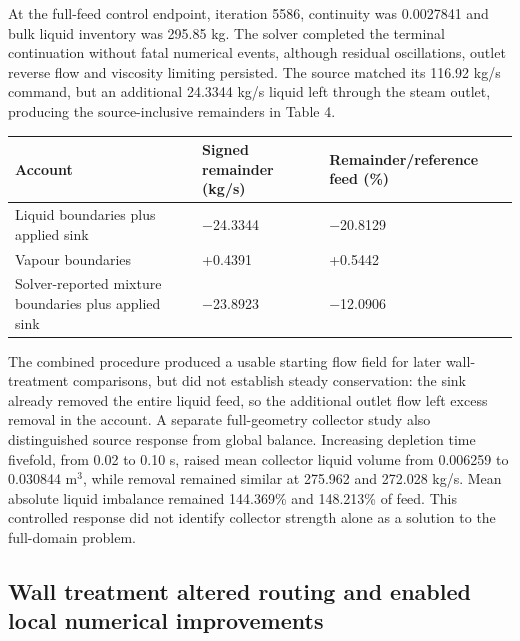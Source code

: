 At the full-feed control endpoint, iteration 5586, continuity was 0.0027841 and bulk liquid inventory was 295.85 kg. The solver completed the terminal continuation without fatal numerical events, although residual oscillations, outlet reverse flow and viscosity limiting persisted. The source matched its 116.92 kg/s command, but an additional 24.3344 kg/s liquid left through the steam outlet, producing the source-inclusive remainders in Table 4.

\noindent\begin{minipage}{\linewidth}
\label{tab:table-4}
\begin{tabular}{@{}>{\raggedright\arraybackslash}p{0.29000000\dimexpr\linewidth-4\tabcolsep\relax}>{\raggedright\arraybackslash}p{0.34000000\dimexpr\linewidth-4\tabcolsep\relax}>{\raggedright\arraybackslash}p{0.37000000\dimexpr\linewidth-4\tabcolsep\relax}@{}}
\toprule
Account & Signed remainder (kg/s) & Remainder/reference feed (\%) \\
\midrule
Liquid boundaries plus applied sink & −24.3344 & −20.8129 \\
Vapour boundaries & +0.4391 & +0.5442 \\
Solver-reported mixture boundaries plus applied sink & −23.8923 & −12.0906 \\
\bottomrule
\end{tabular}
\end{minipage}

The combined procedure produced a usable starting flow field for later wall-treatment comparisons, but did not establish steady conservation: the sink already removed the entire liquid feed, so the additional outlet flow left excess removal in the account. A separate full-geometry collector study also distinguished source response from global balance. Increasing depletion time fivefold, from 0.02 to 0.10 s, raised mean collector liquid volume from 0.006259 to 0.030844 m\(^3\), while removal remained similar at 275.962 and 272.028 kg/s. Mean absolute liquid imbalance remained 144.369\% and 148.213\% of feed. This controlled response did not identify collector strength alone as a solution to the full-domain problem.

\subsection{Wall treatment altered routing and enabled local numerical improvements}

